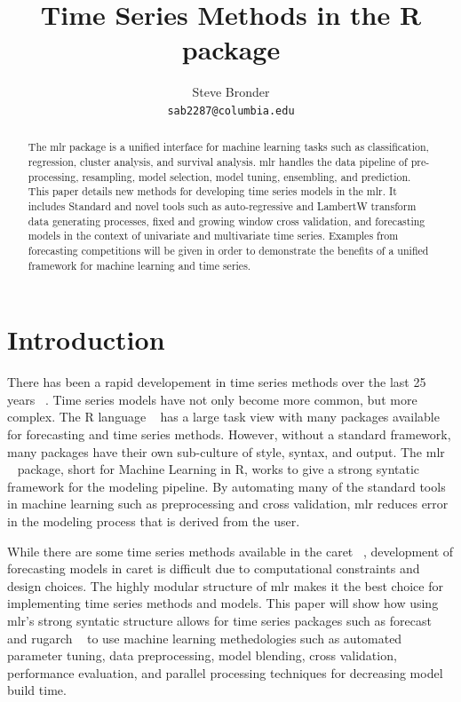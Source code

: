 \documentclass{article}\usepackage[]{graphicx}\usepackage[]{color}
\title{Time Series Methods in the R package \pkg{mlr}}
\author{
  Steve Bronder \\
  \texttt{sab2287@columbia.edu} \\
}
\theoremstyle{definition}
\let\proglang=\textsf
\newcommand{\pkg}[1]{{\fontseries{b}\selectfont #1}}
\begin{document}

\maketitle

\begin{abstract}
The \pkg{mlr} package is a unified interface for machine learning tasks such as classification, regression, cluster analysis, and survival analysis. \pkg{mlr} handles the data pipeline of pre-processing, resampling, model selection, model tuning, ensembling, and prediction. This paper details new methods for developing time series  models in the \pkg{mlr}. It includes Standard and novel tools such as auto-regressive and LambertW transform data generating processes, fixed and growing window cross validation, and forecasting models in the context of univariate and multivariate time series. Examples from forecasting competitions will be given in order to demonstrate the benefits of a unified framework for machine learning and time series.
  \end{abstract}

\section{Introduction}
There has been a rapid developement in time series methods over the last 25 years ~\cite{Hyndman25}. Time series models have not only become more common, but more complex. The \proglang{R} language ~\cite{Rbase} has a large task view with many packages available for forecasting and time series methods. However, without a standard framework, many packages have their own sub-culture of style, syntax, and output. The \pkg{mlr} ~\cite{mlr} package, short for Machine Learning in R, works to give a strong syntatic framework for the modeling pipeline. By automating many of the standard tools in machine learning such as preprocessing and cross validation, \pkg{mlr} reduces error in the modeling process that is derived from the user. 

While there are some time series methods available in the \pkg{caret} ~\cite{caret}, development of forecasting models in \pkg{caret} is difficult due to computational constraints and design choices. The highly modular structure of \pkg{mlr} makes it the best choice for implementing time series methods and models. This paper will show how using \pkg{mlr}'s strong syntatic structure allows for time series packages such as \pkg{forecast} ~\cite{HyndForecast} and \pkg{rugarch} ~\cite{rugarch} to use machine learning methedologies such as automated parameter tuning, data preprocessing, model blending, cross validation, performance evaluation, and parallel processing techniques for decreasing model build time.
\end{document}
